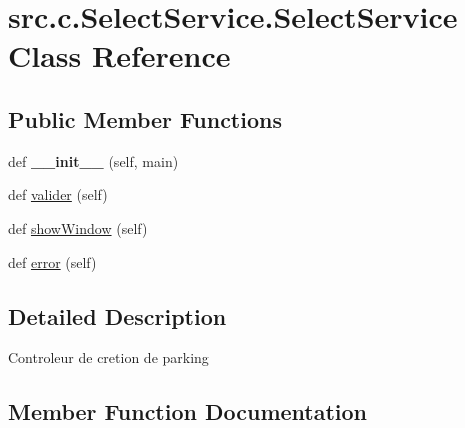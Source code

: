 \hypertarget{classsrc_1_1c_1_1_select_service_1_1_select_service}{}\section{src.\+c.\+Select\+Service.\+Select\+Service Class Reference}
\label{classsrc_1_1c_1_1_select_service_1_1_select_service}
\subsection*{Public Member Functions}
\begin{DoxyCompactItemize}
\item 
\hypertarget{classsrc_1_1c_1_1_select_service_1_1_select_service_a9e48e161bedd4d83c61b163def875c62}{}def {\bfseries \+\_\+\+\_\+init\+\_\+\+\_\+} (self, main)\label{classsrc_1_1c_1_1_select_service_1_1_select_service_a9e48e161bedd4d83c61b163def875c62}

\item 
def \hyperlink{classsrc_1_1c_1_1_select_service_1_1_select_service_ad7c3bc701377c9def0a3e1e54aa11b7e}{valider} (self)
\item 
def \hyperlink{classsrc_1_1c_1_1_select_service_1_1_select_service_a3d52d84aa53d797ff5075cbc187a81c9}{show\+Window} (self)
\item 
def \hyperlink{classsrc_1_1c_1_1_select_service_1_1_select_service_a239610c5cddb976a705b7f0f27cfe51b}{error} (self)
\end{DoxyCompactItemize}


\subsection{Detailed Description}
\begin{DoxyVerb}Controleur de cretion de parking
\end{DoxyVerb}
 

\subsection{Member Function Documentation}
\hypertarget{classsrc_1_1c_1_1_select_service_1_1_select_service_a239610c5cddb976a705b7f0f27cfe51b}{}
